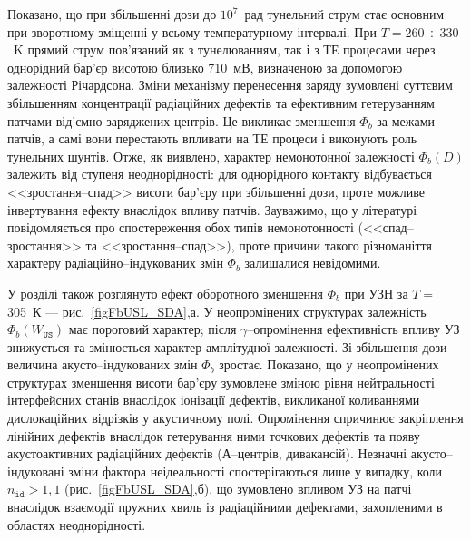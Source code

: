 Показано, що
при збільшенні дози до $10^7$~рад тунельний струм стає основним
при зворотному зміщенні у всьому температурному інтервалі.
При $T=260\div330$~K прямий струм пов'язаний як з тунелюванням, так і з ТЕ процесами через однорідний бар'єр
висотою близько 710~мВ, визначеною за допомогою залежності Річардсона.
Зміни механізму перенесення заряду зумовлені суттєвим збільшенням концентрації радіаційних дефектів
та ефективним гетеруванням патчами від'ємно заряджених центрів.
Це викликає  зменшення $\Phi_b$ за межами патчів, а самі вони перестають впливати на ТЕ процеси 
і виконують роль тунельних шунтів.
Отже, як виявлено, характер немонотонної залежності $\Phi_b(D)$ залежить від ступеня неоднорідності:
для однорідного контакту відбувається <<зростання--спад>> висоти бар'єру при збільшенні дози, проте
можливе інвертування ефекту внаслідок впливу патчів.
Зауважимо, що у літературі повідомляється про спостереження обох типів немонотонності (<<спад--зростання>>
та <<зростання--спад>>),
проте причини такого різноманіття характеру радіаційно--індукованих змін $\Phi_b$ залишалися невідомими.

У розділі також розглянуто ефект оборотного зменшення $\Phi_b$ при
УЗН за $T\!=$305~К --- рис.~\ref{figFbUSL_SDA},а.
У неопромінених структурах залежність $\Phi_b(W_\mathtt{US})$ має пороговий характер;
після $\gamma$--опромінення ефективність впливу УЗ знижується та змінюється характер амплітудної залежності.
Зі збільшення дози величина акусто--індукованих змін $\Phi_b$ зростає.
Показано, що у неопромінених структурах зменшення висоти бар'єру зумовлене зміною рівня нейтральності інтерфейсних станів
внаслідок іонізації дефектів, викликаної коливаннями дислокаційних відрізків у акустичному полі.
Опромінення спричинює закріплення лінійних дефектів внаслідок гетерування ними точкових дефектів та
появу акустоактивних радіаційних дефектів (А--центрів, дивакансій).
Незначні акусто--індуковані зміни фактора неідеальності спостерігаються лише у випадку, коли $n_\mathtt{id}>1,1$ (рис.~\ref{figFbUSL_SDA},б),
що зумовлено впливом УЗ на патчі внаслідок взаємодії пружних хвиль із радіаційними дефектами, захопленими в областях неоднорідності.


